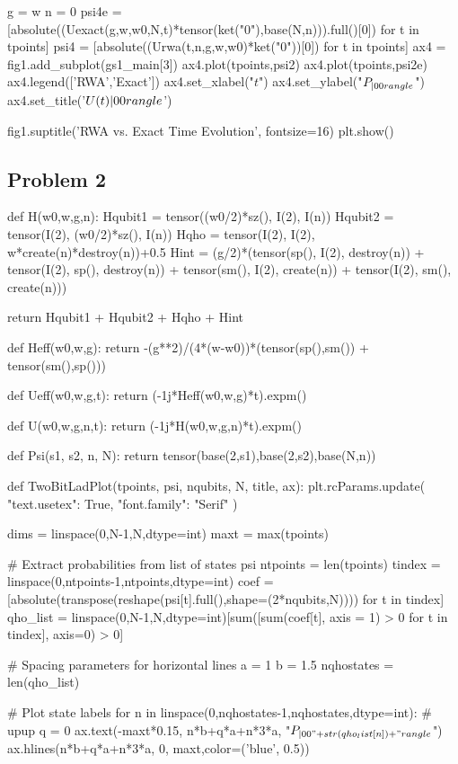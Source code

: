 \begin{python}
g = w
n = 0
psi4e = [absolute((Uexact(g,w,w0,N,t)*tensor(ket("0"),base(N,n))).full()[0]) for t in tpoints]
psi4 = [absolute((Urwa(t,n,g,w,w0)*ket("0"))[0]) for t in tpoints]
ax4 = fig1.add_subplot(gs1_main[3])
ax4.plot(tpoints,psi2)
ax4.plot(tpoints,psi2e)
ax4.legend(['RWA','Exact'])
ax4.set_xlabel("$t$")
ax4.set_ylabel("$P_{| 00 \\rangle}$")
ax4.set_title('$U(t) | 00 \\rangle$')

fig1.suptitle('RWA vs. Exact Time Evolution', fontsize=16)
plt.show()
\end{python}
\pagebreak
\subsection*{Problem 2}
\begin{python}
def H(w0,w,g,n):
    Hqubit1 = tensor((w0/2)*sz(), I(2), I(n))
    Hqubit2 = tensor(I(2), (w0/2)*sz(), I(n))
    Hqho = tensor(I(2), I(2), w*create(n)*destroy(n))+0.5
    Hint = (g/2)*(tensor(sp(), I(2), destroy(n)) + tensor(I(2), sp(), destroy(n)) + tensor(sm(), I(2), create(n)) + tensor(I(2), sm(), create(n)))

    return Hqubit1 + Hqubit2 + Hqho + Hint

def Heff(w0,w,g):
    return -(g**2)/(4*(w-w0))*(tensor(sp(),sm()) + tensor(sm(),sp()))

def Ueff(w0,w,g,t):
    return (-1j*Heff(w0,w,g)*t).expm()
    
def U(w0,w,g,n,t):
    return (-1j*H(w0,w,g,n)*t).expm()

def Psi(s1, s2, n, N):
    return tensor(base(2,s1),base(2,s2),base(N,n))
    
def TwoBitLadPlot(tpoints, psi, nqubits, N, title, ax):
    plt.rcParams.update({
        "text.usetex": True,
        "font.family": "Serif"
    })

    dims = linspace(0,N-1,N,dtype=int)
    maxt = max(tpoints)

    # Extract probabilities from list of states psi
    ntpoints = len(tpoints)
    tindex = linspace(0,ntpoints-1,ntpoints,dtype=int)
    coef = [absolute(transpose(reshape(psi[t].full(),shape=(2*nqubits,N)))) for t in tindex]
    qho_list = linspace(0,N-1,N,dtype=int)[sum([sum(coef[t], axis = 1) > 0 for t in tindex], axis=0) > 0]
    
    # Spacing parameters for horizontal lines
    a = 1
    b = 1.5
    nqhostates = len(qho_list)

    # Plot state labels
    for n in linspace(0,nqhostates-1,nqhostates,dtype=int):
        # upup
        q = 0
        ax.text(-maxt*0.15, n*b+q*a+n*3*a, "$P_{|00"+str(qho_list[n])+"\\rangle}$")
        ax.hlines(n*b+q*a+n*3*a, 0, maxt,color=('blue', 0.5))


\end{python}
